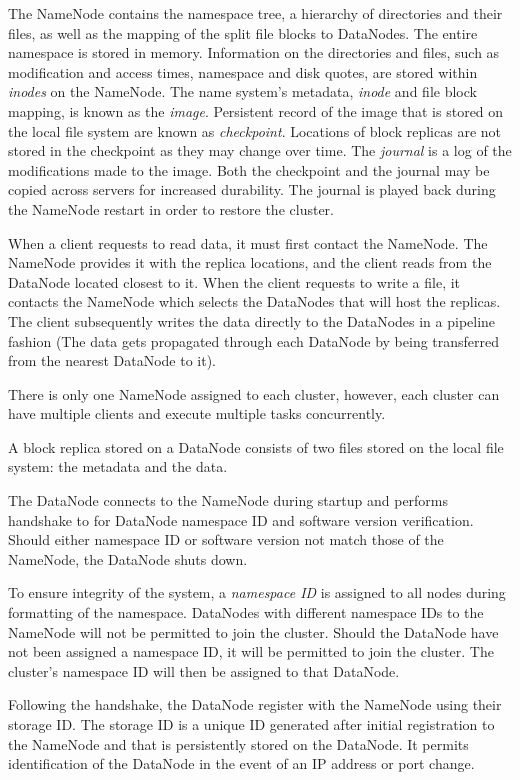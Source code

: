 \documentclass{report}
\begin{document}
The NameNode contains the namespace tree, a hierarchy of directories and their files, as well as the mapping of the split file blocks to DataNodes. The entire namespace is stored in memory. Information on the directories and files, such as modification and access times, namespace and disk quotes, are stored within \textit{inodes} on the NameNode. The name system's metadata, \textit{inode} and file block mapping, is known as the \textit{image}. Persistent record of the image that is stored on the local file system are known as \textit{checkpoint}. Locations of block replicas are not stored in the checkpoint as they may change over time. The \textit{journal} is a log of the modifications made to the image. Both the checkpoint and the journal may be copied across servers for increased durability. The journal is played back during the NameNode restart in order to restore the cluster.

When a client requests to read data, it must first contact the NameNode. The NameNode provides it with the replica locations, and the client reads from the DataNode located closest to it. When the client requests to write a file, it contacts the NameNode which selects the DataNodes that will host the replicas. The client subsequently writes the data directly to the DataNodes in a pipeline fashion (The data gets propagated through each DataNode by being transferred from the nearest DataNode to it).

There is only one NameNode assigned to each cluster, however, each cluster can have multiple clients and execute multiple tasks concurrently.


A block replica stored on a DataNode consists of two files stored on the local file system: the metadata and the data. 

The DataNode connects to the NameNode during startup and performs handshake to for DataNode namespace ID and software version verification. Should either namespace ID or software version not match those of the NameNode, the DataNode shuts down.

To ensure integrity of the system, a \textit{namespace ID} is assigned to all nodes during formatting of the namespace. DataNodes with different namespace IDs to the NameNode will not be permitted to join the cluster. Should the DataNode have not been assigned a namespace ID, it will be permitted to join the cluster. The cluster's namespace ID will then be assigned to that DataNode.


Following the handshake, the DataNode register with the NameNode using their storage ID. The storage ID is a unique ID generated after initial registration to the NameNode and that is persistently stored on the DataNode. It permits identification of the DataNode in the event of an IP address or port change. 
\end{document}
